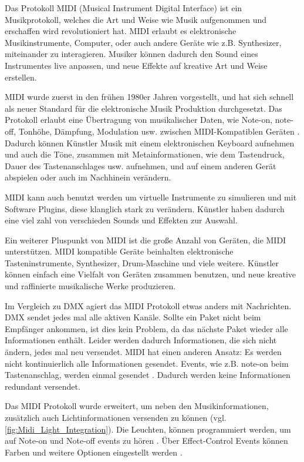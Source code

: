 Das Protokoll MIDI (Musical Instrument Digital Interface) ist ein Musikprotokoll, welches die Art und Weise wie Musik aufgenommen und erschaffen wird revolutioniert hat. MIDI erlaubt es elektronische Musikinstrumente, Computer, oder auch andere Geräte wie z.B. Synthesizer, miteinander zu interagieren. Musiker können dadurch den Sound eines Instrumentes live anpassen, und neue Effekte auf kreative Art und Weise erstellen.

MIDI wurde zuerst in den frühen 1980er Jahren \cite[p.1]{MIDI-Complete-SPECIFICATION} vorgestellt, und hat sich schnell als neuer Standard für die elektronische Musik Produktion durchgesetzt. Das Protokoll erlaubt eine Übertragung von musikalischer Daten, wie Note-on, note-off, Tonhöhe, Dämpfung, Modulation usw. zwischen MIDI-Kompatiblen Geräten \cite[p. 9]{MIDI-DETAILED-SPECIFICATION}. Dadurch können Künstler Musik mit einem elektronischen Keyboard aufnehmen und auch die Töne, zusammen mit Metainformationen, wie dem Tastendruck, Dauer des Tastenanschlages usw. aufnehmen, und auf einem anderen Gerät abspielen oder auch im Nachhinein verändern. 

MIDI kann auch benutzt werden um virtuelle Instrumente zu simulieren und mit Software Plugins, diese klanglich stark zu verändern. Künstler haben dadurch eine viel zahl von verschieden Sounds und Effekten zur Auswahl.

Ein weiterer Pluspunkt von MIDI ist die große Anzahl von Geräten, die MIDI unterstützen. MIDI kompatible Geräte beinhalten elektronische Tasteninstrumente, Synthesizer, Drum-Maschine und viele weitere. Künstler können einfach eine Vielfalt von Geräten zusammen benutzen, und neue kreative und raffinierte musikalische Werke produzieren.

Im Vergleich zu DMX agiert das MIDI Protokoll etwas anders mit Nachrichten. DMX sendet jedes mal alle aktiven Kanäle. Sollte ein Paket nicht beim Empfänger ankommen, ist dies kein Problem, da das nächste Paket wieder alle Informationen enthält. Leider werden dadurch Informationen, die sich nicht ändern, jedes mal neu versendet. MIDI hat einen anderen Ansatz: Es werden nicht kontinuierlich alle Informationen gesendet. Events, wie z.B. note-on beim Tastenanschlag, werden einmal gesendet \cite[p. 3]{MIDI-DETAILED-SPECIFICATION}. Dadurch werden keine Informationen redundant versendet.

Das MIDI Protokoll wurde erweitert, um neben den Musikinformationen, zusätzlich auch Lichtinformationen versenden zu können \cite[p. 1]{MIDI-Visual-Control} (vgl.\ref{fig:Midi_Light_Integration}). Die Leuchten, können programmiert werden, um auf Note-on und Note-off events zu hören \cite[p. 4]{MIDI-Visual-Control}. Über Effect-Control Events können Farben und weitere Optionen eingestellt werden \cite[p. 6, ch. 2.2.1.2]{MIDI-Visual-Control}. 

